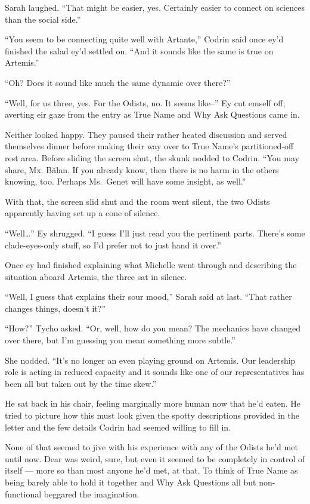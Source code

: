 Sarah laughed. ``That might be easier, yes. Certainly easier to connect on sciences than the social side.''

``You seem to be connecting quite well with Artante,'' Codrin said once ey'd finished the salad ey'd settled on. ``And it sounds like the same is true on Artemis.''

``Oh? Does it sound like much the same dynamic over there?''

``Well, for us three, yes. For the Odists, no. It seems like--'' Ey cut emself off, averting eir gaze from the entry as True Name and Why Ask Questions came in.

Neither looked happy. They paused their rather heated discussion and served themselves dinner before making their way over to True Name's partitioned-off rest area. Before sliding the screen shut, the skunk nodded to Codrin. ``You may share, Mx. Bălan. If you already know, then there is no harm in the others knowing, too. Perhaps Ms.~Genet will have some insight, as well.''

With that, the screen slid shut and the room went silent, the two Odists apparently having set up a cone of silence.

``Well\ldots{}'' Ey shrugged. ``I guess I'll just read you the pertinent parts. There's some clade-eyes-only stuff, so I'd prefer not to just hand it over.''

Once ey had finished explaining what Michelle went through and describing the situation aboard Artemis, the three sat in silence.

``Well, I guess that explains their sour mood,'' Sarah said at last. ``That rather changes things, doesn't it?''

``How?'' Tycho asked. ``Or, well, how do you mean? The mechanics have changed over there, but I'm guessing you mean something more subtle.''

She nodded. ``It's no longer an even playing ground on Artemis. Our leadership role is acting in reduced capacity and it sounds like one of our representatives has been all but taken out by the time skew.''

He sat back in his chair, feeling marginally more human now that he'd eaten. He tried to picture how this must look given the spotty descriptions provided in the letter and the few details Codrin had seemed willing to fill in.

None of that seemed to jive with his experience with any of the Odists he'd met until now. Dear was weird, sure, but even it seemed to be completely in control of itself — more so than most anyone he'd met, at that. To think of True Name as being barely able to hold it together and Why Ask Questions all but non-functional beggared the imagination.

